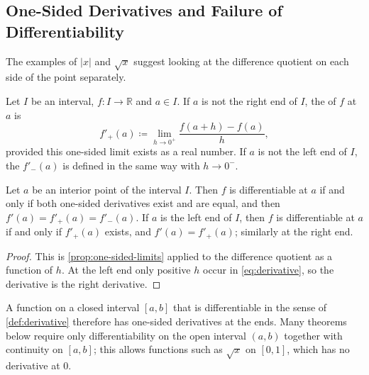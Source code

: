 \subsection{One-Sided Derivatives and Failure of Differentiability}
\label{subsec:one-sided}

The examples of $|x|$ and $\sqrt x$ suggest looking at the difference quotient on each side of the point separately.

\begin{definition}
\label{def:one-sided-derivative}
Let $I$ be an interval, $f\colon I\to\mathbb R$ and $a\in I$. If $a$ is not the right end of $I$, the  of $f$ at $a$ is
\[
f'_+(a)\coloneqq\lim_{h\to0^+}\frac{f(a+h)-f(a)}h ,
\]
provided this one-sided limit exists as a real number. If $a$ is not the left end of $I$, the  $f'_-(a)$ is defined in the same way with $h\to0^-$.
\end{definition}

\begin{proposition}
\label{prop:one-sided-derivatives}
Let $a$ be an interior point of the interval $I$. Then $f$ is differentiable at $a$ if and only if both one-sided derivatives exist and are equal, and then $f'(a)=f'_+(a)=f'_-(a)$. If $a$ is the left end of $I$, then $f$ is differentiable at $a$ if and only if $f'_+(a)$ exists, and $f'(a)=f'_+(a)$; similarly at the right end.
\end{proposition}

\begin{proof}
This is \cref{prop:one-sided-limits} applied to the difference quotient as a function of $h$. At the left end only positive $h$ occur in \eqref{eq:derivative}, so the derivative is the right derivative.
\end{proof}

A function on a closed interval $[a,b]$ that is differentiable in the sense of \cref{def:derivative} therefore has one-sided derivatives at the ends. Many theorems below require only differentiability on the open interval $(a,b)$ together with continuity on $[a,b]$; this allows functions such as $\sqrt x$ on $[0,1]$, which has no derivative at $0$.

